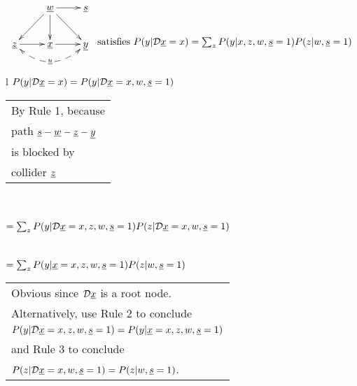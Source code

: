 \begin{claim}
$$
\xymatrix{
&\rvw\ar[dl]\ar[dr]\ar[r]\ar[d]
&\rvs
\\
\rvz\ar[r]\ar@/_1.5pc/@{<-->}[rr]|{\;\rvu\;}
&\rvx\ar[r]
&\rvy
}
\xymatrix{\\ 
\text{ satisfies }
P(y|\cald \rvx = x)= \sum_z P(y|x,z,w,\rvs=1)P(z|w, \rvs=1)}
$$
\end{claim}
\proof
\begin{longtable}{l}
\color{red}
$P(y|{\cal D}{\underline{x}}=x)=P(y|{\cal D}{\underline{x}}=x, w, {\underline{s}}=1)$
\\
\xymatrix{
\\
=
}
\begin{tabular}{l}
By Rule 1, because\\
path
${\underline{s}}-{\underline{w}}-{\underline{z}}-{\underline{y}}$\\
is blocked by
\\
collider ${\underline{z}}$
\end{tabular}
\\
\\
\color{red}
$=\sum_z P(y|{\cal D}{\underline{x}}=x,z,w,{\underline{s}}=1)
P(z|{\cal D}{\underline{x}}=x, w, {\underline{s}}=1)$
\\
\\
\\
\color{red}
$=\sum_z P(y|{\underline{x}}=x,z,w,{\underline{s}}=1)
P(z| w, {\underline{s}}=1)$
\\
\begin{tabular}{l}\\
Obvious since ${\cal D} {\underline{x}}$ is a root node.\\
Alternatively, use
Rule 2 to  conclude\\ 
$P(y|{\cal D}{\underline{x}}=x,z,w,{\underline{s}}=1)=
P(y|{\underline{x}}=x,z,w,{\underline{s}}=1)$\\
and Rule  3 to 
conclude\\ 
$P(z|{\cal D}{\underline{x}}=x, w, {\underline{s}}=1)=
P(z| w, {\underline{s}}=1)$.
\end{tabular}
\end{longtable}